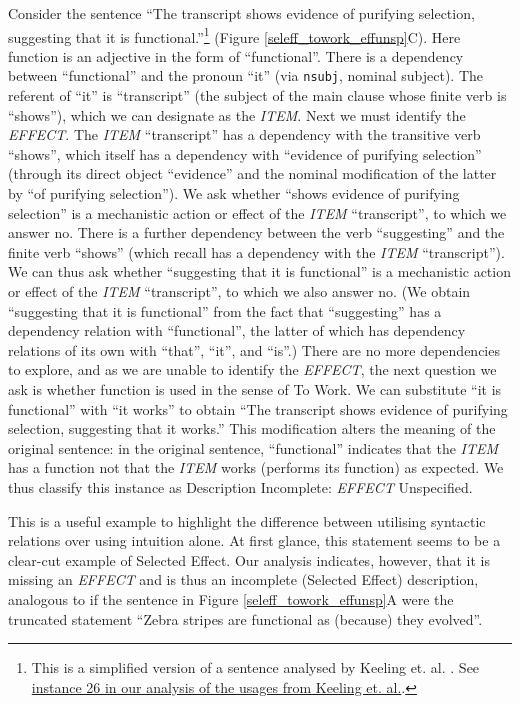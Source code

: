 \documentclass{article}
\begin{document}
Consider the sentence ``The transcript shows evidence of purifying selection, suggesting that it is functional.''\footnote{This is a simplified version of a sentence analysed by Keeling et. al. \cite{keeling2019}. See \href{https://joshuachristie.github.io/function-concepts/examples_Keeling_et_al_2019.html}{instance 26 in our analysis of the usages from Keeling et. al.}.} (Figure \ref{seleff_towork_effunsp}C).
Here function is an adjective in the form of ``functional''.
There is a dependency between ``functional'' and the pronoun ``it'' (via \texttt{nsubj}, nominal subject).
The referent of ``it'' is ``transcript'' (the subject of the main clause whose finite verb is ``shows''), which we can designate as the \emph{ITEM}.
Next we must identify the \emph{EFFECT}.
The \emph{ITEM} ``transcript'' has a dependency with the transitive verb ``shows'', which itself has a dependency with ``evidence of purifying selection'' (through its direct object ``evidence'' and the nominal modification of the latter by ``of purifying selection'').
We ask whether ``shows evidence of purifying selection'' is a mechanistic action or effect of the \emph{ITEM} ``transcript'', to which we answer no.
There is a further dependency between the verb ``suggesting'' and the finite verb ``shows'' (which recall has a dependency with the \emph{ITEM} ``transcript'').
We can thus ask whether ``suggesting that it is functional'' is a mechanistic action or effect of the \emph{ITEM} ``transcript'', to which we also answer no.
(We obtain ``suggesting that it is functional'' from the fact that ``suggesting'' has a dependency relation with ``functional'', the latter of which has dependency relations of its own with ``that'', ``it'', and ``is''.)
There are no more dependencies to explore, and as we are unable to identify the \emph{EFFECT}, the next question we ask is whether function is used in the sense of To Work.
We can substitute ``it is functional'' with ``it works'' to obtain ``The transcript shows evidence of purifying selection, suggesting that it works.''
This modification alters the meaning of the original sentence: in the original sentence, ``functional'' indicates that the \emph{ITEM} has a function not that the \emph{ITEM} works (performs its function) as expected.
We thus classify this instance as Description Incomplete: \emph{EFFECT} Unspecified.

This is a useful example to highlight the difference between utilising syntactic relations over using intuition alone.
At first glance, this statement seems to be a clear-cut example of Selected Effect.
Our analysis indicates, however, that it is missing an \emph{EFFECT} and is thus an incomplete (Selected Effect) description, analogous to if the sentence in Figure \ref{seleff_towork_effunsp}A were the truncated statement ``Zebra stripes are functional as (because) they evolved''.
\end{document}
